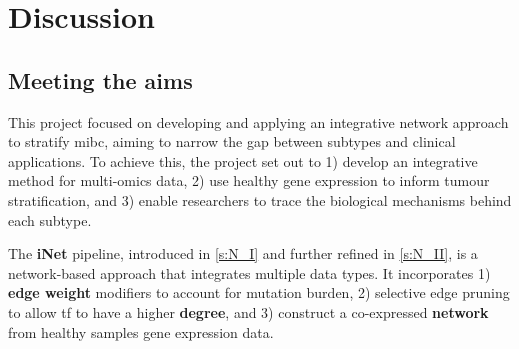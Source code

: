 \chapter{Discussion} \label{s:discussion}

\vspace{3mm}
\vspace{3mm}


\section{Meeting the aims}

This project focused on developing and applying an integrative network approach to stratify \acrlong{mibc}, aiming to narrow the gap between subtypes and clinical applications. To achieve this, the project set out to 1) develop an integrative method for multi-omics data, 2) use healthy gene expression to inform tumour stratification, and 3) enable researchers to trace the biological mechanisms behind each subtype.


The \textbf{iNet} pipeline, introduced in \cref{s:N_I} and further refined in \cref{s:N_II}, is a network-based approach that integrates multiple data types. It incorporates 1) \textbf{edge weight} modifiers to account for mutation burden, 2) selective edge pruning to allow \acrlong{tf} to have a higher \textbf{degree}, and 3) construct a co-expressed \textbf{network} from healthy samples gene expression data.


